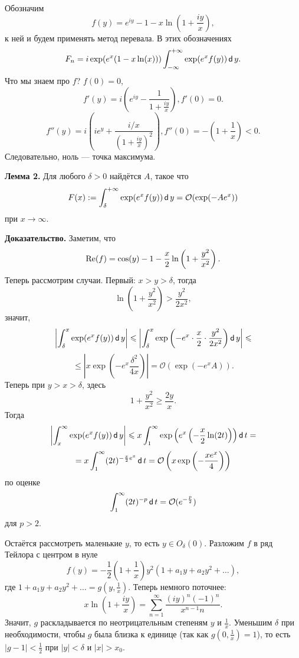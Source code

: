 Обозначим
\[
    f(y) = e^{iy} - 1 - x \ln \left(1 + \frac{iy}{x} \right),
\]
к ней и будем применять метод перевала.
В этих обозначениях
\[
    F_n = i \exp(e^x (1 - x \ln(x))) \int_{-\infty}^{+\infty} \exp(e^x f(y)) \operatorname{\mathsf d} y.
\]
Что мы знаем про $f$? $f(0) = 0$, 
\[
    f'(y) = i \left( e^{iy} - \frac{1}{1 + \frac{iy}{x}} \right), f'(0) = 0.
\]
\[
    f''(y) = i \left( ie^y + \frac{i/x}{\left(1 + \frac{iy}{x} \right)^2} \right), f''(0) = -\left(1 + \frac{1}{x} \right) < 0.
\]
Следовательно, ноль --- точка максимума.

\textbf{Лемма 2.} Для любого $\delta > 0$ найдётся $A$, такое что
\[
    F(x) := \int_\delta^{+\infty} \exp(e^x f(y)) \operatorname{\mathsf d} y = \mathcal O(\exp(-Ae^x))
\]
при $x \to \infty$.

\textbf{Доказательство.} Заметим, что
\[
    \operatorname{Re}(f) = \cos(y) - 1 - \frac{x}{2} \ln \left(1 + \frac{y^2}{x^2} \right).
\]
Теперь рассмотрим случаи.
Первый: $x > y > \delta$, тогда
\[
    \ln \left(1 + \frac{y^2}{x^2} \right) > \frac{y^2}{2x^2},
\]
значит,
\[
    \left| \int_\delta^{x} \exp(e^x f(y)) \operatorname{\mathsf d} y \right| \leqslant \left| \int_{\delta}^x \exp\left( -e^x \cdot \frac{x}{2} \cdot \frac{y^2}{2x^2} \right) \operatorname{\mathsf d} y \right| \leqslant 
\]
\[
    \le \left| x \exp\left(-e^x \frac{\delta^2}{4x} \right) \right| = \mathcal O(\exp(-e^x A)).
\]
Теперь при $y > x > \delta$, здесь 
\[
    1 + \frac{y^2}{x^2} \ge \frac{2y}{x}.
\]
Тогда
\[
\left| \int_x^\infty \exp(e^x f(y)) \operatorname{\mathsf d} y \right| \leqslant x \int_1^\infty \exp \left(e^x \left( -\frac{x}{2} \ln(2t) \right) \right) \operatorname{\mathsf d} t =
\]
\[
    = x \int_1^\infty (2t)^{-\frac{x}{2} e^x} \operatorname{\mathsf d} t = \mathcal O \left(x \exp\left(-\frac{xe^x}{4} \right) \right)
\]
по оценке
\[
    \int_1^\infty (2t)^{-p} \operatorname{\mathsf d} t = \mathcal O(e^{-\frac{p}{2}})
\]
для $p > 2$.

Остаётся рассмотреть маленькие $y$, то есть $y \in O_\delta(0)$.
Разложим $f$ в ряд Тейлора с центром в нуле
\[
    f(y) = -\frac{1}{2} \left(1 + \frac{1}{x} \right) y^2 \left(1 + a_1 y + a_2 y^2 + \dots \right),
\]
где $1 + a_1y + a_2y^2 + \dots = g \left(y, \frac{1}{x} \right)$.
Теперь немного поточнее:
\[
    x \ln \left(1 + \frac{iy}{x} \right) = \sum_{n=1}^{\infty} \frac{(iy)^n (-1)^n}{x^{n-1}n}.
\]
Значит, $g$ раскладывается по неотрицательным степеням $y$ и $\frac{1}{x}$.
Уменьшим $\delta$ при необходимости, чтобы $g$ была близка к единице (так как $g(0, \frac{1}{x}) = 1$), то есть $|g - 1| < \frac{1}{2}$ при $|y| < \delta$ и $|x| > x_0$.

